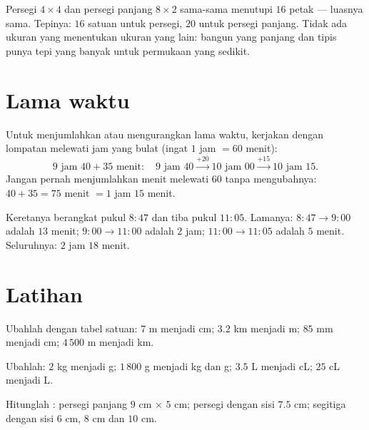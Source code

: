 \begin{example}\label{ex:g4:measure:samearea}
Persegi $4 \times 4$ dan persegi panjang $8 \times 2$ sama-sama
menutupi $16$ petak --- luasnya sama. Tepinya: $16$ satuan untuk
persegi, $20$ untuk persegi panjang. Tidak ada ukuran yang
menentukan ukuran yang lain: bangun yang panjang dan tipis punya
tepi yang banyak untuk permukaan yang sedikit.
\end{example}

\section{Lama waktu}

\begin{method}\label{met:g4:measure:time}
Untuk menjumlahkan atau mengurangkan lama waktu, kerjakan dengan
lompatan melewati jam yang bulat (ingat $1$ jam $= 60$ menit):
\[
9\text{ jam }40 + 35 \text{ menit}:
\quad 9\text{ jam }40 \xrightarrow{+20} 10\text{ jam }00
\xrightarrow{+15} 10\text{ jam }15 .
\]
Jangan pernah menjumlahkan menit melewati $60$ tanpa mengubahnya:
$40 + 35 = 75$ menit $= 1$ jam $15$ menit.
\end{method}

\begin{example}\label{ex:g4:measure:timetable}
Keretanya berangkat pukul $8{:}47$ dan tiba pukul $11{:}05$.
Lamanya: $8{:}47 \to 9{:}00$ adalah $13$ menit;
$9{:}00 \to 11{:}00$ adalah $2$ jam; $11{:}00 \to 11{:}05$ adalah
$5$ menit. Seluruhnya: $2$ jam $18$ menit.
\end{example}

\section{Latihan}

\begin{exercise}[$\star$]\label{exo:g4:measure:1}
Ubahlah dengan tabel satuan: $7$ m menjadi cm; $3.2$ km menjadi m;
$85$ mm menjadi cm; $4\,500$ m menjadi km.
\end{exercise}

\begin{exercise}[$\star$]\label{exo:g4:measure:2}
Ubahlah: $2$ kg menjadi g; $1\,800$ g menjadi kg dan g; $3.5$ L
menjadi cL; $25$ cL menjadi L.
\end{exercise}

\begin{exercise}[$\star$]\label{exo:g4:measure:3}
Hitunglah : persegi panjang $9$ cm $\times$ $5$ cm;
persegi dengan sisi $7.5$ cm; segitiga dengan sisi $6$ cm, $8$ cm dan $10$ cm.
\end{exercise}

